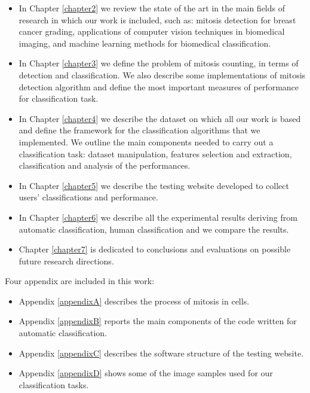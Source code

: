 \begin{itemize}
 \item In Chapter \ref{chapter2} we review the state of the art in the main fields of research in which our 
 work is included, such as: mitosis detection for breast cancer grading, applications of computer vision techniques
 in biomedical imaging, and machine learning methods for biomedical classification.
 \item In Chapter \ref{chapter3} we define the problem of mitosis counting, in terms of detection and classification.
 We also describe some implementations of mitosis detection algorithm and define the most important measures of performance for classification task.
 \item In Chapter \ref{chapter4} we describe the dataset on which all our work is based and define the framework for the classification algorithms that
 we implemented. We outline the main components needed to carry out a classification task: dataset manipulation, features selection and extraction, 
 classification and analysis of the performances.
 \item In Chapter \ref{chapter5} we describe the testing website developed to collect users' classifications and performance.
 \item In Chapter \ref{chapter6} we describe all the experimental results deriving from automatic classification, human classification and we compare
 the results.
 \item Chapter \ref{chapter7} is dedicated to conclusions and evaluations on possible future research directions.
\end{itemize}

Four appendix are included in this work:

\begin{itemize}
 \item Appendix \ref{appendixA} describes the process of mitosis in cells.
 \item Appendix \ref{appendixB} reports the main components of the code written for automatic classification.
 \item Appendix \ref{appendixC} describes the software structure of the testing website.
 \item Appendix \ref{appendixD} shows some of the image samples used for our classification tasks.
\end{itemize}




